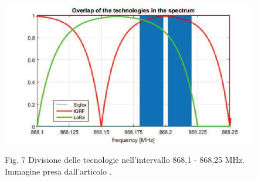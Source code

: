 \documentclass[a4paper]{report} %
\begin{document}
\begin{figure}
	\centering
	\includegraphics[scale=.5]{Immagini/DivB2.png}
	
	Fig. 7 Divisione delle tecnologie nell'intervallo 868,1 - 868,25 MHz.\\ %
	Immagine presa dall'articolo \cite{art:rif.46}.
\end{figure}
\end{document}
